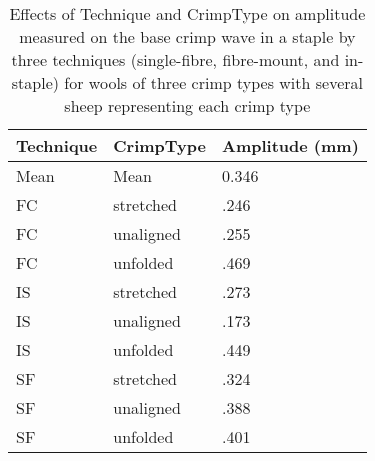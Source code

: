 %

\begin{table}[htp]
\centering
\caption{Effects of Technique and CrimpType on amplitude  measured on the base crimp wave in a staple by three techniques (single-fibre, fibre-mount, and in-staple) for wools of three crimp types with several sheep representing each crimp type}
\label{tab:fameans}
\vspace{0.1in}
\begin{tabular}{|p{1.0in}|p{1.0in}|p{0.9in}|} \hline
     Technique  & CrimpType & Amplitude (mm) \\  \hline
 Mean &  Mean       & 0.346  \\ \hline
 FC & stretched     & .246          \\
 FC & unaligned     & .255          \\
 FC & unfolded     &  .469          \\ \hline
 IS & stretched     & .273     \\
 IS & unaligned     & .173     \\
 IS & unfolded     &  .449     \\ \hline
 SF & stretched     & .324        \\
 SF & unaligned     & .388        \\
 SF & unfolded      & .401        \\ \hline
\end{tabular}
\end{table}

%
